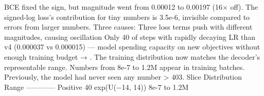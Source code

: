 {} BCE fixed the sign, but magnitude went from 0.00012 to 0.00197 (16× off). The signed-log loss's contribution for tiny numbers is \markdownRendererTilde{}3.5e-6, invisible compared to errors from larger numbers.\markdownRendererParagraphSeparator
{} Three causes:\markdownRendererInterblockSeparator
{}\markdownRendererOlBeginTight
{} Three loss terms push with different magnitudes, causing oscillation\markdownRendererOlItemEnd 
{} Only 40\markdownRendererPercentSign{} of steps with rapidly decaying LR\markdownRendererOlItemEnd 
{} than v4 (0.000037 vs 0.000015) — model spending capacity on new objectives without enough training budget\markdownRendererOlItemEnd 
\markdownRendererOlEndTight \markdownRendererInterblockSeparator
{}\markdownRendererThematicBreak{}\markdownRendererInterblockSeparator
{}
\markdownRendererSectionEnd 
\markdownRendererSectionEnd \markdownRendererSectionBegin
{}\markdownRendererInterblockSeparator
{}\markdownRendererSectionBegin
{}\markdownRendererInterblockSeparator
{}  → .\markdownRendererParagraphSeparator
{}The training distribution now matches the decoder's representable range. Numbers from \markdownRendererTilde{}8e-7 to \markdownRendererTilde{}1.2M appear in training batches. Previously, the model had never seen any number > 403.\markdownRendererParagraphSeparator
{}\markdownRendererPipe{} Slice \markdownRendererPipe{} \markdownRendererPercentSign{} \markdownRendererPipe{} Distribution \markdownRendererPipe{} Range \markdownRendererPipe{}\markdownRendererSoftLineBreak
{}\markdownRendererPipe{}---\markdownRendererPipe{}---\markdownRendererPipe{}---\markdownRendererPipe{}---\markdownRendererPipe{}\markdownRendererSoftLineBreak
{}\markdownRendererPipe{} Positive \markdownRendererPipe{} 40\markdownRendererPercentSign{} \markdownRendererPipe{} exp(U(−14, 14)) \markdownRendererPipe{} \markdownRendererTilde{}8e-7 to \markdownRendererTilde{}1.2M \markdownRendererPipe{}\markdownRendererSoftLineBreak
